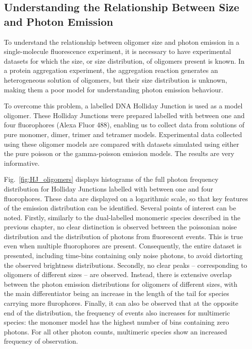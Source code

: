 \clearpage  

\subsection{Understanding the Relationship Between Size and Photon Emission}
To understand the relationship between oligomer size and photon emission in a single-molecule fluorescence experiment, it is necessary to have experimental datasets for which the size, or size distribution, of oligomers present is known. In a protein aggregation experiment, the aggregation reaction generates an heterogeneous solution of oligomers, but their size distribution is unknown, making them a poor model for understanding photon emission behaviour. 

To overcome this problem, a labelled DNA Holliday Junction is used as a model oligomer. These Holliday Junctions were prepared labelled with between one and four fluorophores (Alexa Fluor 488), enabling us to collect data from solutions of pure monomer, dimer, trimer and tetramer models. Experimental data collected using these oligomer models are compared with datasets simulated using either the pure poisson or the gamma-poisson emission models. The results are very informative.

Fig.~\ref{fig:HJ_oligomers} displays histograms of the full photon frequency distribution for Holliday Junctions labelled with between one and four fluorophores. These data are displayed on a logarithmic scale, so that key features of the emission distribution can be identified. Several points of interest can be noted. Firstly, similarly to the dual-labelled monomeric species described in the previous chapter, no clear distinction is observed between the poissonian noise distribution and the distribution of photons from fluorescent events. This is true even when multiple fluorophores are present. Consequently, the entire dataset is presented, including time-bins containing only noise photons, to avoid distorting the observed brightness distributions. Secondly, no clear peaks -- corresponding to oligomers of different sizes -- are observed. Instead, there is extensive overlap between the photon emission distributions for oligomers of different sizes, with the main differentiator being an increase in the length of the tail for species carrying more flurophores. Finally, it can also be observed that at the opposite end of the distribution, the frequency of events also increases for multimeric species: the monomer model has the highest number of bins containing zero photons. For all other photon counts, multimeric species show an increased frequency of observation. 

